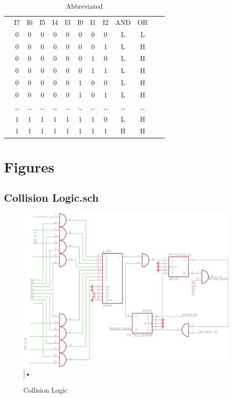 \documentclass[letterpaper,titlepage,oneside]{article}
\begin{document}
\begin{center}
\begin{table}['h']
\begin{tabular}{c|c|c|c|c|c|c|c|c|c|c|c|c}
\cline{2-11}
& I7 & I6 & I5 & I4 & I3 & I0 & I1 & I2 & AND & OR \\ 
\cline{2-11}
& 0 & 0 & 0 & 0 & 0 & 0 & 0 & 0 & L & L  \\  
& 0 & 0 & 0 & 0 & 0 & 0 & 0 & 1 & L & H \\
& 0 & 0 & 0 & 0 & 0 & 0 & 1 & 0 & L & H \\
& 0 & 0 & 0 & 0 & 0 & 0 & 1 & 1 & L & H \\
& 0 & 0 & 0 & 0 & 0 & 1 & 0 & 0 & L & H \\
& 0 & 0 & 0 & 0 & 0 & 1 & 0 & 1 & L & H \\
& \ldots{} & \ldots{} & \ldots{} & \ldots{} & \ldots{} & \ldots{} & %
\ldots{} & \ldots{} & \ldots{} & \ldots{}\\
& 1 & 1 & 1 & 1 & 1 & 1 & 1 & 0 & L & H \\
& 1 & 1 & 1 & 1 & 1 & 1 & 1 & 1 & H & H \\
\cline{2-11}
\end{tabular}
\caption{Abbreviated}\label{8AndOr_Unminimized}
\end{table}
\end{center}


\pagebreak

\section{Figures}

\subsection*{Collision Logic.sch}
\begin{center}
\begin{figure}[hp]
\centering
\includegraphics[keepaspectratio=true]{Circuit Diagrams/Collision Logic.png}]{•}
\caption{Collision Logic}
\end{figure}

\end{center}
\end{document}
